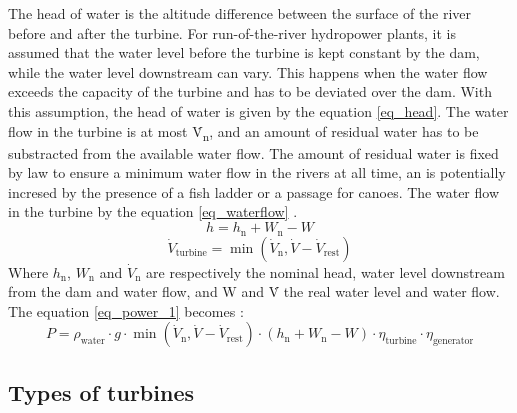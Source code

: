 The head of water is the altitude difference between the surface of the river before and after the turbine. For run-of-the-river hydropower plants, it is assumed that the water level before the turbine is kept constant by the dam, while the water level downstream can vary. This happens when the water flow exceeds the capacity of the turbine and has to be deviated over the dam. With this assumption, the head of water is given by the equation \ref{eq_head}. The water flow in the turbine is at most \.{V}\textsubscript{n}, and an amount of residual water has to be substracted from the available water flow. The amount of residual water is fixed by law to ensure a minimum water flow in the rivers at all time, an is potentially incresed by the presence of a fish ladder or a passage for canoes. The water flow in the turbine by the equation \ref{eq_waterflow} \cite{quaschning}.
\begin{equation}
\label{eq_head} 
 h = h_\mathrm{n} +W_\mathrm{n}-W
\end{equation}
\begin{equation}
\label{eq_waterflow} 
 \dot{V}_\mathrm{turbine} = \min(\dot{V}_\mathrm{n},\dot{V}-\dot{V}_\mathrm{rest})
\end{equation}
Where $h_\mathrm{n}$, $W_\mathrm{n}$ and $\dot{V}_\mathrm{n}$ are respectively the nominal head, water level downstream from the dam and water flow, and W and \.{V} the real water level and water flow.
\newline
The  equation \ref{eq_power_1} becomes :
\begin{equation}
 \label{eq_power_2} 
 P = \rho_\mathrm{water} \cdot g \cdot \min(\dot{V}_\mathrm{n},\dot{V}-\dot{V}_\mathrm{rest}) \cdot (h_\mathrm{n} +W_\mathrm{n}-W) \cdot \eta_\mathrm{turbine} \cdot \eta_\mathrm{generator}
\end{equation}

\subsection{Types of turbines}

